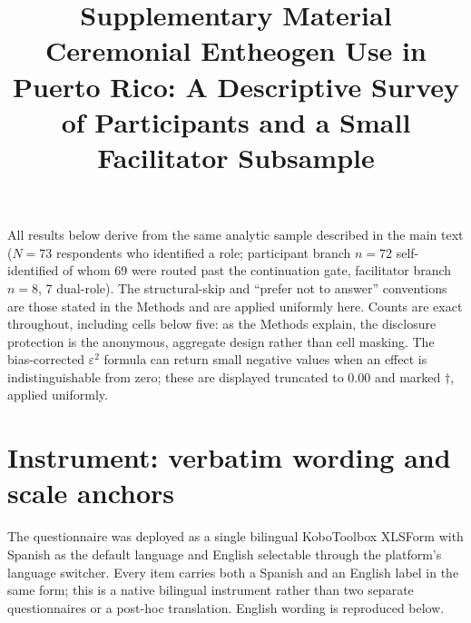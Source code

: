 \documentclass[12pt]{article}
\title{Supplementary Material\\
\large Ceremonial Entheogen Use in Puerto Rico: A Descriptive Survey of Participants and a Small
Facilitator Subsample}
\date{}
\begin{document}
\maketitle

\noindent
All results below derive from the same analytic sample described in the main text ($N=73$ respondents who
identified a role; participant branch $n=72$ self-identified of whom 69 were routed past the continuation
gate, facilitator branch $n=8$, 7 dual-role). The structural-skip and ``prefer not to answer'' conventions
are those stated in the Methods and are applied uniformly here. Counts are exact throughout, including
cells below five: as the Methods explain, the disclosure protection is the anonymous, aggregate design
rather than cell masking. The bias-corrected $\varepsilon^2$ formula can return small negative values when
an effect is indistinguishable from zero; these are displayed truncated to 0.00 and marked $\dagger$,
applied uniformly.

\section{Instrument: verbatim wording and scale anchors}

The questionnaire was deployed as a single bilingual KoboToolbox XLSForm with Spanish as the default
language and English selectable through the platform's language switcher. Every item carries both a Spanish
and an English label in the same form; this is a native bilingual instrument rather than two separate
questionnaires or a post-hoc translation. English wording is reproduced below.
\end{document}
